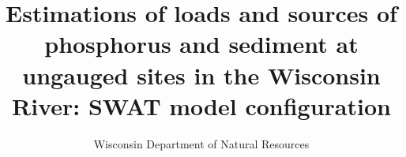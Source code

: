 \documentclass[10pt,letterpaper]{article}%
\author{Wisconsin Department of Natural Resources}
\title{Estimations of loads and sources of phosphorus and sediment at ungauged sites in the Wisconsin River: SWAT model configuration}
\begin{document}
\maketitle
\pagebreak

\tableofcontents
\pagebreak

\listoffigures
\pagebreak

\listoftables
\pagebreak









\end{document}
